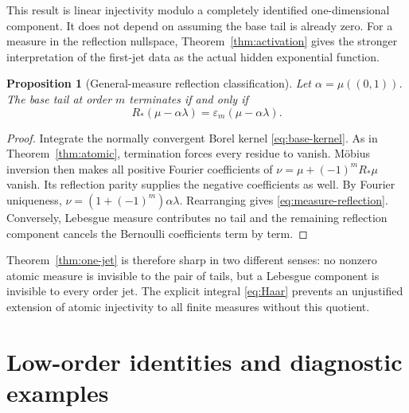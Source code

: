 \documentclass[11pt,a4paper]{article}
\numberwithin{equation}{section}
\newtheorem{proposition}[theorem]{Proposition}
\theoremstyle{definition}\newtheorem{definition}[theorem]{Definition}
\theoremstyle{remark}\newtheorem{remark}[theorem]{Remark}
\newcommand{\eps}{\varepsilon}\newcommand{\muh}{\widehat\mu}
\begin{document}
This result is linear injectivity modulo a completely identified
one-dimensional component. It does not depend on assuming the base
tail is already zero. For a measure in the reflection nullspace,
Theorem~\ref{thm:activation} gives the stronger interpretation of the
first-jet data as the actual hidden exponential function.

\begin{proposition}[General-measure reflection classification]
\label{prop:measure-reflection}
Let $\alpha=\mu((0,1))$. The base tail at order $m$ terminates if and
only if
\begin{equation}
 R_*(\mu-\alpha\lambda)=\eps_m(\mu-\alpha\lambda).
 \label{eq:measure-reflection}
\end{equation}
\end{proposition}
\begin{proof}
Integrate the normally convergent Borel kernel
\eqref{eq:base-kernel}. As in Theorem~\ref{thm:atomic}, termination
forces every residue to vanish. M\"obius inversion then makes all
positive Fourier coefficients of
$\nu=\mu+(-1)^mR_*\mu$ vanish. Its reflection parity supplies the
negative coefficients as well. By Fourier uniqueness,
$\nu=(1+(-1)^m)\alpha\lambda$. Rearranging gives
\eqref{eq:measure-reflection}. Conversely, Lebesgue measure contributes
no tail and the remaining reflection component cancels the Bernoulli
coefficients term by term.
\end{proof}

Theorem~\ref{thm:one-jet} is therefore sharp in two different senses:
no nonzero atomic measure is invisible to the pair of tails, but a
Lebesgue component is invisible to every order jet. The explicit
integral \eqref{eq:Haar} prevents an unjustified extension of atomic
injectivity to all finite measures without this quotient.

\section{Low-order identities and diagnostic examples}
\label{sec:examples}
\end{document}
